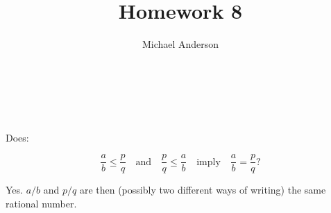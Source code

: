 \documentclass{article}
\author{Michael Anderson}
\title{Homework 8}
\begin{document}
\maketitle
{}
\\
\flushleft
\newpage

\section{}
Does:

\[
\frac{a}{b} \le \frac{p}{q} \hspace{1em} \text{and} \hspace{1em} \frac{p}{q}
\le \frac{a}{b} \hspace{1em} \text{imply} \hspace{1em}
\frac{a}{b} = \frac{p}{q}\text{?}
\]

Yes. $a/b$ and $p/q$ are then (possibly two different ways of writing) the same
rational number.
\end{document}
